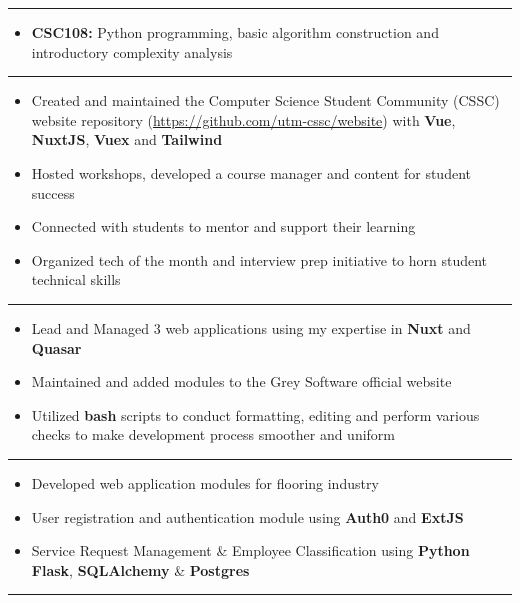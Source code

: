 \documentclass[10pt,a4paper,ragged2e]{altacv}
\begin{document}
\rule{\linewidth}{0.2pt}

\begin{itemize}
    \item \textbf{CSC108:} Python programming, basic algorithm construction and introductory complexity analysis
\end{itemize}

\rule{\linewidth}{0.2pt}

\begin{itemize}
    \item Created and maintained the Computer Science Student Community (CSSC) website repository (\href{https://github.com/utm-cssc/website}{https://github.com/utm-cssc/website}) with \textbf{Vue}, \textbf{NuxtJS}, \textbf{Vuex} and \textbf{Tailwind}
    \item Hosted workshops, developed a course manager and content for student success
    \item Connected with students to mentor and support their learning
    \item Organized tech of the month and interview prep initiative to horn student technical skills
\end{itemize}

\rule{\linewidth}{0.2pt}

\begin{itemize}
    \item Lead and Managed 3 web applications using my expertise in \textbf{Nuxt} and \textbf{Quasar}
    \item Maintained and added modules to the Grey Software official website
    \item Utilized \textbf{bash} scripts to conduct formatting, editing and perform various checks to make development process smoother and uniform
\end{itemize}

\rule{\linewidth}{0.2pt}

\begin{itemize}
    \item Developed web application modules for flooring industry
    \item User registration and authentication module using \textbf{Auth0} and \textbf{ExtJS}
    \item Service Request Management \& Employee Classification using \textbf{Python Flask}, \textbf{SQLAlchemy} \& \textbf{Postgres}
\end{itemize}

\rule{\linewidth}{0.2pt}

\vspace{5pt}

\vspace{1px}
\clearpage
\end{document}
